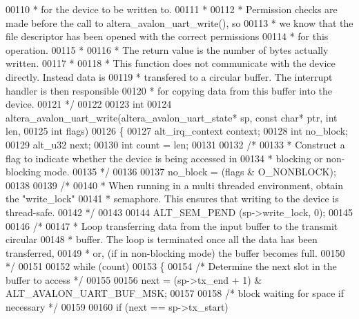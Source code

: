 \begin{DoxyCode}
00110 \textcolor{comment}{ * for the device to be written to.}
00111 \textcolor{comment}{ *}
00112 \textcolor{comment}{ * Permission checks are made before the call to altera\_avalon\_uart\_write(), so}
00113 \textcolor{comment}{ * we know that the file descriptor has been opened with the correct permissions}
00114 \textcolor{comment}{ * for this operation.}
00115 \textcolor{comment}{ *}
00116 \textcolor{comment}{ * The return value is the number of bytes actually written.}
00117 \textcolor{comment}{ *}
00118 \textcolor{comment}{ * This function does not communicate with the device directly. Instead data is}
00119 \textcolor{comment}{ * transfered to a circular buffer. The interrupt handler is then responsible}
00120 \textcolor{comment}{ * for copying data from this buffer into the device.}
00121 \textcolor{comment}{ */}
00122 
00123 \textcolor{keywordtype}{int}
00124 altera_avalon_uart_write(altera_avalon_uart_state* sp, \textcolor{keyword}{const} \textcolor{keywordtype}{char}* ptr, \textcolor{keywordtype}{int} len,
00125   \textcolor{keywordtype}{int} flags)
00126 \{
00127   alt_irq_context context;
00128   \textcolor{keywordtype}{int}             no\_block;
00129   alt_u32         next;
00130   \textcolor{keywordtype}{int}             count = len;
00131 
00132   \textcolor{comment}{/* }
00133 \textcolor{comment}{   * Construct a flag to indicate whether the device is being accessed in}
00134 \textcolor{comment}{   * blocking or non-blocking mode.}
00135 \textcolor{comment}{   */}
00136 
00137   no\_block = (flags & O\_NONBLOCK);
00138 
00139   \textcolor{comment}{/*}
00140 \textcolor{comment}{   * When running in a multi threaded environment, obtain the "write\_lock"}
00141 \textcolor{comment}{   * semaphore. This ensures that writing to the device is thread-safe.}
00142 \textcolor{comment}{   */}
00143 
00144   ALT_SEM_PEND (sp->write\_lock, 0);
00145 
00146   \textcolor{comment}{/*}
00147 \textcolor{comment}{   * Loop transferring data from the input buffer to the transmit circular}
00148 \textcolor{comment}{   * buffer. The loop is terminated once all the data has been transferred,}
00149 \textcolor{comment}{   * or, (if in non-blocking mode) the buffer becomes full.}
00150 \textcolor{comment}{   */}
00151 
00152   \textcolor{keywordflow}{while} (count)
00153   \{
00154     \textcolor{comment}{/* Determine the next slot in the buffer to access */}
00155 
00156     next = (sp->tx_end + 1) & ALT_AVALON_UART_BUF_MSK;
00157 
00158     \textcolor{comment}{/* block waiting for space if necessary */}
00159 
00160     \textcolor{keywordflow}{if} (next == sp->tx_start)

\end{DoxyCode}
